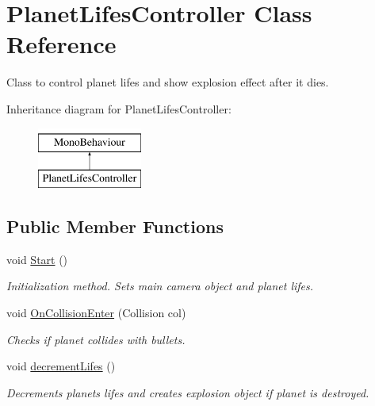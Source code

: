 \hypertarget{class_planet_lifes_controller}{}\section{Planet\+Lifes\+Controller Class Reference}
\label{class_planet_lifes_controller}


Class to control planet lifes and show explosion effect after it dies.  


Inheritance diagram for Planet\+Lifes\+Controller\+:\begin{figure}[H]
\begin{center}
\leavevmode
\includegraphics[height=2.000000cm]{class_planet_lifes_controller}
\end{center}
\end{figure}
\subsection*{Public Member Functions}
\begin{DoxyCompactItemize}
\item 
void \mbox{\hyperlink{class_planet_lifes_controller_acb812ee09ae6ed65b85baf971a582b25}{Start}} ()
\begin{DoxyCompactList}\small\item\em Initialization method. Sets main camera object and planet lifes. \end{DoxyCompactList}\item 
void \mbox{\hyperlink{class_planet_lifes_controller_a5f701b24bb0d90d38d049dec137f90b5}{On\+Collision\+Enter}} (Collision col)
\begin{DoxyCompactList}\small\item\em Checks if planet collides with bullets. \end{DoxyCompactList}\item 
void \mbox{\hyperlink{class_planet_lifes_controller_af81b69ec4a2d059ebd24bff38031a466}{decrement\+Lifes}} ()
\begin{DoxyCompactList}\small\item\em Decrements planet\textquotesingle{}s lifes and creates explosion object if planet is destroyed. \end{DoxyCompactList}\end{DoxyCompactItemize}
